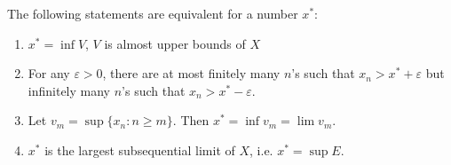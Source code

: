 \begin{proposition}
	The following statements are equivalent for a number $x^*$:
	\begin{enumerate}
		\item $x^* = \operatorname{inf} V$, $V$ is almost upper bounds of $X$ 
		\item For any $\varepsilon>0$, there are at most finitely many $n $'s such that $x_n > x^* + \varepsilon$ but infinitely many $n$'s such that $x_n > x^* - \varepsilon$.
		\item Let $v_m = \operatorname{sup} \{x_n: n \ge m\} $. Then $x^* = \operatorname{inf} v_m = \lim v_m$.
		\item $x^*$ is the largest subsequential limit of  $X$, i.e. $x^* = \operatorname{sup}  E$.
	\end{enumerate}
\end{proposition}
